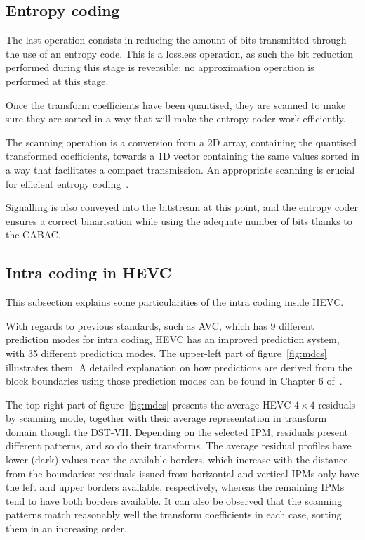 \documentclass[11pt,a4paper,openright,twoside]{book}
\numberwithin{equation}{section} %
\numberwithin{figure}{section} %
\numberwithin{table}{section} %
\begin{document}
\subsection{Entropy coding}
\label{sub:entropy_coding}

The last operation consists in reducing the amount of bits transmitted through
the use of an entropy code.
This is a lossless operation, as such the bit reduction performed during this
stage is reversible: no approximation operation is performed at this stage.

Once the transform coefficients have been quantised, they are scanned to make
sure they are sorted in a way that will make the entropy coder work
efficiently.

The scanning operation is a conversion from a 2D array, containing the
quantised transformed coefficients, towards a 1D vector containing the same
values sorted in a way that facilitates a compact transmission.
An appropriate scanning is crucial for efficient entropy
coding~\cite{ye-08-intra-directional-scanning-mddt}.

Signalling is also conveyed into the bitstream at this point, and the
entropy coder ensures a correct binarisation while using the adequate
number of bits thanks to the \ac{CABAC}.

\subsection{Intra coding in \acs{HEVC}}
\label{sub:intra_coding_in_hevc}

This subsection explains some particularities of the intra coding inside
\ac{HEVC}.

With regards to previous standards, such as \ac{AVC}, which has 9 different
prediction modes for intra coding, \ac{HEVC} has an improved prediction
system, with 35 different prediction modes.
The upper-left part of figure~\ref{fig:mdcs} illustrates them.
A detailed explanation on how predictions are derived from the block
boundaries using those prediction modes can be found in Chapter 6
of~\cite{wien-15-hevc}.

The top-right part of figure~\ref{fig:mdcs} presents the average \ac{HEVC}
$4\times4$ residuals by scanning mode, together with their average
representation in transform domain though the \acs{DST}-VII.
Depending on the selected \ac{IPM}, residuals present different patterns, and
so do their transforms.
The average residual profiles have lower (dark) values near the
available borders, which increase with the distance from the
boundaries: residuals issued from horizontal and vertical \acp{IPM} only
have the left and upper borders available, respectively, whereas the
remaining \acp{IPM} tend to have both borders available.
It can also be observed that the scanning patterns match reasonably well
the transform coefficients in each case, sorting them in an increasing
order.
\end{document}
